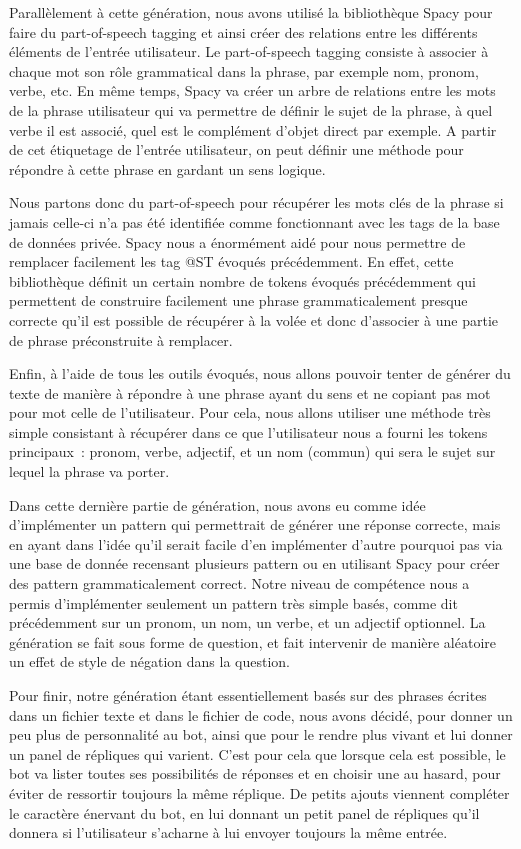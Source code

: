 \documentclass[paper=a4, fontsize=12pt]{article}
\begin{document}
Parallèlement à cette génération, nous avons utilisé la bibliothèque Spacy pour faire du part-of-speech tagging et ainsi créer des relations entre les différents éléments de l’entrée utilisateur.
Le part-of-speech tagging consiste à associer à chaque mot son rôle grammatical dans la phrase, par exemple nom, pronom, verbe, etc. En même temps, Spacy va créer un arbre de relations entre les mots de la phrase utilisateur qui va permettre de définir le sujet de la phrase, à quel verbe il est associé, quel est le complément d’objet direct par exemple. A partir de cet étiquetage de l’entrée utilisateur, on peut définir une méthode pour répondre à cette phrase en gardant un sens logique.


	Nous partons donc du part-of-speech pour récupérer les mots clés de la phrase si jamais celle-ci n’a pas été identifiée comme fonctionnant avec les tags de la base de données privée. Spacy nous a énormément aidé pour nous permettre de remplacer facilement les tag @ST évoqués précédemment. En effet, cette bibliothèque définit un certain nombre de tokens évoqués précédemment qui permettent de construire facilement une phrase grammaticalement presque correcte qu’il est possible de récupérer à la volée et donc d’associer à une partie de phrase préconstruite à remplacer.
	
	
	Enfin, à l’aide de tous les outils évoqués, nous allons pouvoir tenter de générer du texte de manière à répondre à une phrase ayant du sens et ne copiant pas mot pour mot celle de l’utilisateur. Pour cela, nous allons utiliser une méthode très simple consistant à récupérer dans ce que l’utilisateur nous a fourni les tokens principaux : pronom, verbe, adjectif, et un nom (commun) qui sera le sujet sur lequel la phrase va porter. 
	
	
	Dans cette dernière partie de génération, nous avons eu comme idée d’implémenter un pattern qui permettrait de générer une réponse correcte, mais en ayant dans l’idée qu’il serait facile d’en implémenter d’autre pourquoi pas via une base de donnée recensant plusieurs pattern ou en utilisant Spacy pour créer des pattern grammaticalement correct. Notre niveau de compétence nous a permis d’implémenter seulement un pattern très simple basés, comme dit précédemment sur un pronom, un nom, un verbe, et un adjectif optionnel. La génération se fait sous forme de question, et fait intervenir de manière aléatoire un effet de style de négation dans la question.
	
	
	Pour finir, notre génération étant essentiellement basés sur des phrases écrites dans un fichier texte et dans le fichier de code, nous avons décidé, pour donner un peu plus de personnalité au bot, ainsi que pour le rendre plus vivant et lui donner un panel de répliques qui varient. C’est pour cela que lorsque cela est possible, le bot va lister toutes ses possibilités de réponses et en choisir une au hasard, pour éviter de ressortir toujours la même réplique. De petits ajouts viennent compléter le caractère énervant du bot, en lui donnant un petit panel de répliques qu’il donnera si l’utilisateur s’acharne à lui envoyer toujours la même entrée.
	
\end{document}
